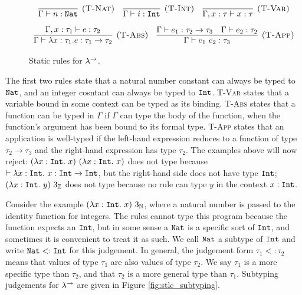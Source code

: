 \begin{figure}[h]


\[
\begin{array}{c}

\infer[\textsc{(T-Nat)}]
	{\Gamma \vdash n: \Nat}
	{}
	~~~
\infer[\textsc{(T-Int)}]
	{\Gamma \vdash i: \Int}
	{}
~~~
\infer[\textsc{(T-Var)}]
	{\Gamma, x: \tau \vdash x: \tau}
	{} \\[2ex]
	
\infer[\textsc{(T-Abs)}]
	{\Gamma \vdash \lambda x: \tau_1.e : \tau_1 \rightarrow \tau_2}
	{\Gamma, x: \tau_1 \vdash e: \tau_2} 
	~~~
	
\infer[\textsc{(T-App)}]
	{\Gamma \vdash e_1~e_2: \tau_3}
	{\Gamma \vdash e_1: \tau_2 \rightarrow \tau_3 & \Gamma \vdash e_2: \tau_2}

\end{array}
\]


\vspace{-12pt}
\caption{Static rules for $\lambda^{\rightarrow}$.}
\label{fig:stlc_static_rules}
\end{figure}

The first two rules state that a natural number constant can always be typed to $\mathtt{Nat}$, and an integer cosntant can always be typed to $\mathtt{Int}$. \textsc{T-Var} states that a variable bound in some context can be typed as its binding. \textsc{T-Abs} states that a function can be typed in $\Gamma$ if $\Gamma$ can type the body of the function, when the function's argument has been bound to its formal type. \textsc{T-App} states that an application is well-typed if the left-hand expression reduces to a function of type $\tau_2 \rightarrow \tau_3$ and the right-hand expression has type $\tau_2$. The examples above will now reject: $(\lambda x: \mathtt{Int}.~x)~(\lambda x:\mathtt{Int}.~x)$ does not type because $\vdash \lambda x: \mathtt{Int}.~x : \mathtt{Int} \rightarrow \mathtt{Int}$, but the right-hand side does not have type $\mathtt{Int}$; $(\lambda x: \mathtt{Int}.~y)~3_{\mathbb{Z}}$ does not type because no rule can type $y$ in the context $x: \mathtt{Int}$.

Consider the example $(\lambda x: \mathtt{Int}.~x)~3_{\mathbb{N}}$, where a natural number is passed to the identity function for integers. The rules cannot type this program because the function expects an $\mathtt{Int}$, but in some sense a $\mathtt{Nat}$ is a specific sort of $\mathtt{Int}$, and sometimes it is convenient to treat it as such. We call $\mathtt{Nat}$ a subtype of $\mathtt{Int}$ and write $\mathtt{Nat} <: \mathtt{Int}$ for this judgement. In general, the judgement form $\tau_1 <: \tau_2$ means that values of type $\tau_1$ are also values of type $\tau_2$. We say $\tau_1$ is a more specific type than $\tau_2$, and that $\tau_2$ is a more general type than $\tau_1$. Subtyping judgements for $\lambda^{\rightarrow}$ are given in Figure \ref{fig:stlc_subtyping}. 

